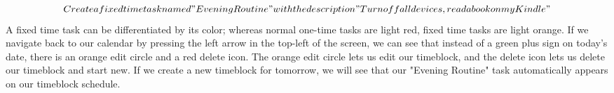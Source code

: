 \documentclass[notitlepage]{report}
\begin{document}
\[Create a fixed time task named "Evening Routine" with the description "Turn off all devices, read a book on my Kindle"\]  
A fixed time task can be differentiated by its color; whereas normal one-time tasks are light red, fixed time tasks are light orange.
If we navigate back to our calendar by pressing the left arrow in the top-left of the screen, we can see that instead of a green plus sign on today's date, there is an orange edit circle and a red delete icon. The orange edit circle lets us edit our timeblock, and the delete icon lets us delete our timeblock and start new.
If we create a new timeblock for tomorrow, we will see that our "Evening Routine" task automatically appears on our timeblock schedule.
\end{document}

